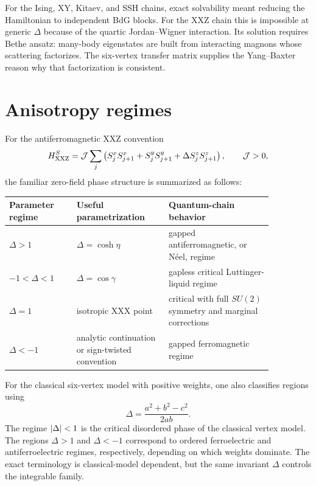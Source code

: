 \begin{remark}
For the Ising, XY, Kitaev, and SSH chains, exact solvability meant reducing the
Hamiltonian to independent BdG blocks.  For the XXZ chain this is impossible at
generic $\Delta$ because of the quartic Jordan--Wigner interaction.  Its solution
requires Bethe ansatz: many-body eigenstates are built from interacting magnons
whose scattering factorizes.  The six-vertex transfer matrix supplies the
Yang--Baxter reason why that factorization is consistent.
\end{remark}

\section{Anisotropy regimes}
\label{sec:six-vertex-xxz-regimes}

For the antiferromagnetic XXZ convention
\begin{equation}
\label{eq:xxz-standard-spin-regime-convention}
    H_{\rm XXZ}^{S}
    =
    \mathcal{J}\sum_j
    \left(
        S_j^xS_{j+1}^x
        +S_j^yS_{j+1}^y
        +\Delta S_j^zS_{j+1}^z
    \right),
    \qquad
    \mathcal{J}>0,
\end{equation}
the familiar zero-field phase structure is summarized as follows:
\begin{center}
\begin{tabular}{@{}L{0.22\linewidth}L{0.30\linewidth}L{0.34\linewidth}@{}}
\toprule
Parameter regime & Useful parametrization & Quantum-chain behavior \\
\midrule
$\Delta>1$ & $\Delta=\cosh\eta$ & gapped antiferromagnetic, or N\'{e}el, regime \\
$-1<\Delta<1$ & $\Delta=\cos\gamma$ & gapless critical Luttinger-liquid regime \\
$\Delta=1$ & isotropic XXX point & critical with full $SU(2)$ symmetry and marginal corrections \\
$\Delta<-1$ & analytic continuation or sign-twisted convention & gapped ferromagnetic regime \\
\bottomrule
\end{tabular}
\end{center}
For the classical six-vertex model with positive weights, one also classifies
regions using
\begin{equation}
    \Delta=\frac{a^2+b^2-c^2}{2ab} .
\end{equation}
The regime $\left|\Delta\right|<1$ is the critical disordered phase of the classical
vertex model.  The regions $\Delta>1$ and $\Delta<-1$ correspond to ordered
ferroelectric and antiferroelectric regimes, respectively, depending on which
weights dominate.  The exact terminology is classical-model dependent, but the
same invariant $\Delta$ controls the integrable family.


